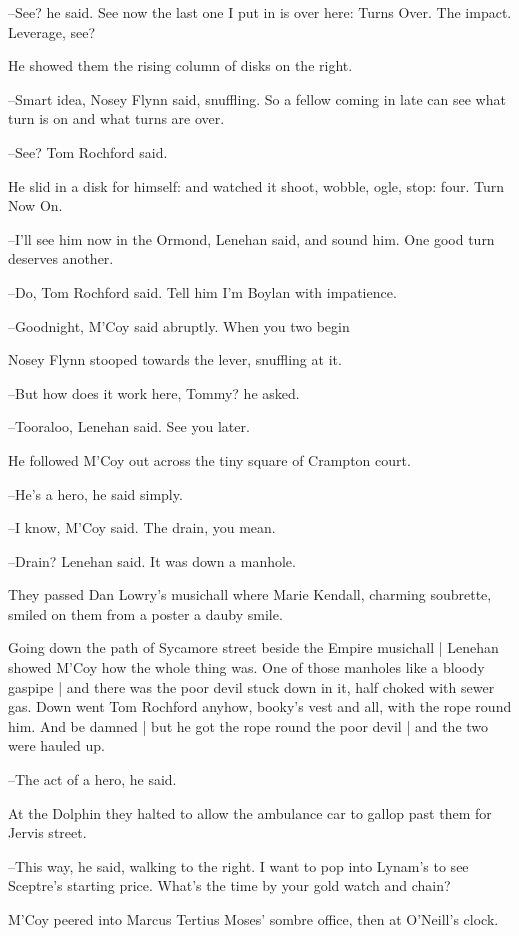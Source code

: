 --See? he said. See now the last one I put in is over here: Turns Over.
The impact. Leverage, see?

He showed them the rising column of disks on the right.

--Smart idea, Nosey Flynn said, snuffling.
So a fellow coming in late can
see what turn is on and what turns are over.

--See? Tom Rochford said.

He slid in a disk for himself: and watched it shoot, wobble, ogle, stop:
four. Turn Now On.

--I'll see him now in the Ormond, Lenehan said, and sound him. One good
turn deserves another.

--Do, Tom Rochford said. Tell him I'm Boylan with impatience.

--Goodnight, M'Coy said abruptly. When you two begin

Nosey Flynn stooped towards the lever, snuffling at it.

--But how does it work here, Tommy? he asked.

--Tooraloo, Lenehan said.
See you later.

He followed M'Coy out across the tiny square of Crampton court.

--He's a hero, he said simply.

--I know, M'Coy said. The drain, you mean.

--Drain? Lenehan said. It was down a manhole.

They passed Dan Lowry's musichall where Marie Kendall, charming
soubrette, smiled on them from a poster a dauby smile.

Going down the path of Sycamore street beside the Empire musichall |
Lenehan showed M'Coy how the whole thing was.
One of those manholes like a bloody gaspipe |
and there was the poor devil stuck down in it,
half choked with sewer gas.
Down went Tom Rochford anyhow,
booky's vest and all,
with the rope round him.
And be damned |
but he got the rope round the poor devil |
and the two were hauled up.

--The act of a hero, he said.

At the Dolphin they halted to allow the ambulance car to gallop past
them for Jervis street.

--This way, he said, walking to the right. I want to pop into Lynam's to
see Sceptre's starting price. What's the time by your gold watch and
chain?

M'Coy peered into Marcus Tertius Moses' sombre office, then at
O'Neill's clock.

